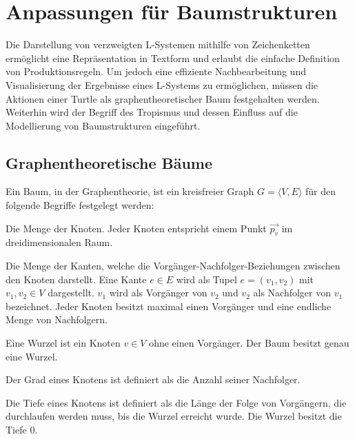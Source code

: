 \section{Anpassungen für Baumstrukturen}\label{sec:LS_Baumstrukturen}

Die Darstellung von verzweigten L-Systemen mithilfe von Zeichenketten ermöglicht eine Repräsentation in Textform und erlaubt die einfache Definition von Produktionsregeln. Um jedoch eine effiziente Nachbearbeitung und Visualisierung der Ergebnisse eines L-Systems zu ermöglichen, müssen die Aktionen einer Turtle als graphentheoretischer Baum festgehalten werden. Weiterhin wird der Begriff des Tropismus und dessen Einfluss auf die Modellierung von Baumstrukturen eingeführt.

\subsection{Graphentheoretische Bäume}

Ein Baum, in der Graphentheorie, ist ein kreisfreier Graph $G = \langle V,E\rangle$ für den folgende Begriffe festgelegt werden:

\begin{description}[labelindent]
	\item[\boldmath$V$] Die Menge der Knoten. Jeder Knoten entspricht einem Punkt $\overrightarrow{p_v}$ im dreidimensionalen Raum. \cite[S.358]{ThI:14}\\
	
	\item[\boldmath$E$] Die Menge der Kanten, welche die Vorgänger-Nachfolger-Beziehungen zwischen den Knoten darstellt. Eine Kante $e \in E$ wird als Tupel $e = (v_1, v_2)$ mit $v_1, v_2 \in V$ dargestellt. $v_1$ wird als Vorgänger von $v_2$ und $v_2$ als Nachfolger von $v_1$ bezeichnet. Jeder Knoten besitzt maximal einen Vorgänger und eine endliche Menge von Nachfolgern. \cite[S.358]{ThI:14} \cite[S.29]{AlgoDat:14}\\
	
	\item[\boldmath$Wurzel$] Eine Wurzel ist ein Knoten $v \in V$ ohne einen Vorgänger. Der Baum besitzt genau eine Wurzel. \cite[S.358]{ThI:14}\\
	
	\item[\boldmath$Grad$] Der Grad eines Knotens ist definiert als die Anzahl seiner Nachfolger. \cite[S.29]{AlgoDat:14}\\
	
	\item[\boldmath$Tiefe$] Die Tiefe eines Knotens ist definiert als die Länge der Folge von Vorgängern, die durchlaufen werden muss, bis die Wurzel erreicht wurde. Die Wurzel besitzt die Tiefe $0$. \cite[S.30]{AlgoDat:14}
\end{description}

